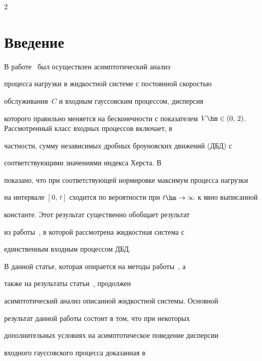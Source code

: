       \begin{multicols}{2}





            \label{st\stat}





\section{Введение}





В работе~\cite{Lukashenko} был осуществлен асимптотический анализ


процесса нагрузки в жидкостной  системе  с постоянной скоростью


обслуживания~$C$  и входным  гауссовским процессом, дисперсия


которого правильно меняется на бесконечности с показателем $V\hm\in


(0,\,2)$. Рассмотренный  класс входных процессов включает, в


частности, сумму независимых дробных броуновских движений (ДБД) с


соответствующими значениями индекса Херста. В~\cite{Lukashenko}


показано, что при соответствующей нормировке максимум  процесса нагрузки


  на интервале $[0,\,t]$ сходится по вероятности при  $t\hm\to \infty$  к  явно выписанной


константе.  Этот результат существенно обобщает результат


из работы~\cite{Zeevi}, в которой рассмотрена  жидкостная система с


единственным входным процессом ДБД.





В данной статье, которая  опирается на методы работы~\cite{Zeevi}, а


также на результаты  статьи~\cite{Lukashenko}, продолжен


асимптотический анализ описанной жидкостной системы. Основной


результат данной работы состоит в том, что при некоторых


дополнительных условиях на асимптотическое поведение дисперсии


входного гауссовского процесса доказанная  в~\cite{Lukashenko}



\end{multicols}
